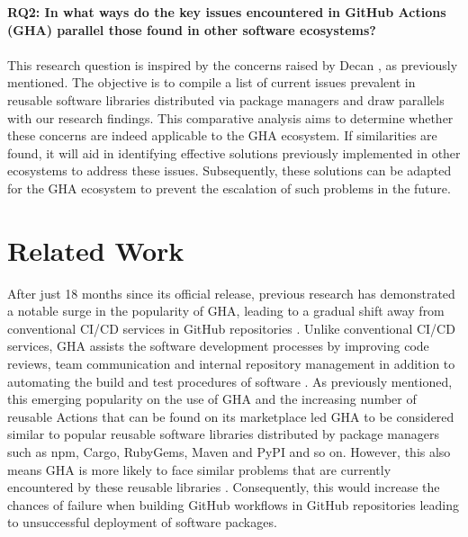 \documentclass[conference]{IEEEtran}
\begin{document}
 \textbf{RQ2: In what ways do the key issues encountered in GitHub Actions (GHA) parallel those found in other software ecosystems?}\\\\
    This research question is inspired by the concerns raised by Decan \cite{decan2022use}, as previously mentioned. The objective is to compile a list of current issues prevalent in reusable software libraries distributed via package managers and draw parallels with our research findings. This comparative analysis aims to determine whether these concerns are indeed applicable to the GHA ecosystem. If similarities are found, it will aid in identifying effective solutions previously implemented in other ecosystems to address these issues. Subsequently, these solutions can be adapted for the GHA ecosystem to prevent the escalation of such problems in the future.




\section{Related Work}
    After just 18 months since its official release, previous research has demonstrated a notable surge in the popularity of GHA, leading to a gradual shift away from conventional CI/CD services in GitHub repositories \cite{golzadeh2021rise}. Unlike conventional CI/CD services, GHA assists the software development processes by improving code reviews, team communication and internal repository management in addition to automating the build and test procedures of software \cite{chandrasekara2021hands}. As previously mentioned, this emerging popularity on the use of GHA and the increasing number of reusable Actions that can be found on its marketplace led GHA to be considered similar to popular reusable software libraries distributed by package managers such as npm, Cargo, RubyGems, Maven and PyPI and so on. However, this also means GHA is more likely to face similar problems that are currently encountered by these reusable libraries \cite{decan2022use}. Consequently, this would increase the chances of failure when building GitHub workflows in GitHub repositories leading to unsuccessful deployment of software packages. \\
\end{document}
